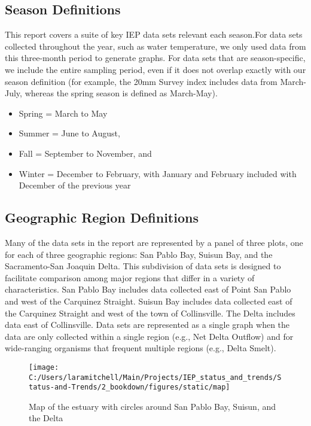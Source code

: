\documentclass[
]{book}
\providecommand{\tightlist}{%
  \setlength{\itemsep}{0pt}\setlength{\parskip}{0pt}}
\begin{document}
\hypertarget{season-definitions}{%
\subsection{Season Definitions}\label{season-definitions}}

This report covers a suite of key IEP data sets relevant each season.For data sets collected throughout the year, such as water temperature, we only used data from this three-month period to generate graphs. For data sets that are season-specific, we include the entire sampling period, even if it does not overlap exactly with our season definition (for example, the 20mm Survey index includes data from March-July, whereas the spring season is defined as March-May).

\begin{itemize}
\tightlist
\item
  Spring = March to May
\item
  Summer = June to August,
\item
  Fall = September to November, and\\
\item
  Winter = December to February, with January and February included with December of the previous year
\end{itemize}

\hypertarget{geographic-region-definitions}{%
\subsection{Geographic Region Definitions}\label{geographic-region-definitions}}

Many of the data sets in the report are represented by a panel of three plots, one for each of three geographic regions: San Pablo Bay, Suisun Bay, and the Sacramento-San Joaquin Delta. This subdivision of data sets is designed to facilitate comparison among major regions that differ in a variety of characteristics. San Pablo Bay includes data collected east of Point San Pablo and west of the Carquinez Straight. Suisun Bay includes data collected east of the Carquinez Straight and west of the town of Collinsville. The Delta includes data east of Collinsville. Data sets are represented as a single graph when the data are only collected within a single region (e.g., Net Delta Outflow) and for wide-ranging organisms that frequent multiple regions (e.g., Delta Smelt).

\begin{figure}
\texttt{[image: C:/Users/laramitchell/Main/Projects/IEP\_status\_and\_trends/Status-and-Trends/2\_bookdown/figures/static/map]} \caption{Map of the estuary with circles around San Pablo Bay, Suisun, and the Delta}\label{fig:unnamed-chunk-186}
\end{figure}
\end{document}
